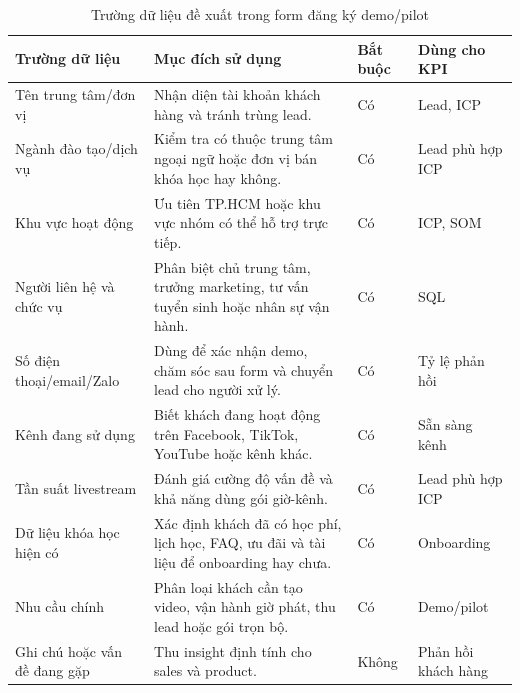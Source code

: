 \begin{table}[H]
    \centering
    \footnotesize
    \setlength{\tabcolsep}{3pt}
    \renewcommand{\arraystretch}{1.22}
    \caption{Trường dữ liệu đề xuất trong form đăng ký demo/pilot}
    \label{tab:lead-form-fields-1stream}
    \begin{tabularx}{\linewidth}{@{}L{3.0cm}Y L{2.3cm}L{2.4cm}@{}}
        \toprule
        \textbf{Trường dữ liệu} &
        \textbf{Mục đích sử dụng} &
        \textbf{Bắt buộc} &
        \textbf{Dùng cho KPI} \\ \midrule

        Tên trung tâm/đơn vị &
        Nhận diện tài khoản khách hàng và tránh trùng lead. &
        Có &
        Lead, ICP \\

        Ngành đào tạo/dịch vụ &
        Kiểm tra có thuộc trung tâm ngoại ngữ hoặc đơn vị bán khóa học hay không. &
        Có &
        Lead phù hợp ICP \\

        Khu vực hoạt động &
        Ưu tiên TP.HCM hoặc khu vực nhóm có thể hỗ trợ trực tiếp. &
        Có &
        ICP, SOM \\

        Người liên hệ và chức vụ &
        Phân biệt chủ trung tâm, trưởng marketing, tư vấn tuyển sinh hoặc nhân
        sự vận hành. &
        Có &
        SQL \\

        Số điện thoại/email/Zalo &
        Dùng để xác nhận demo, chăm sóc sau form và chuyển lead cho người xử lý. &
        Có &
        Tỷ lệ phản hồi \\

        Kênh đang sử dụng &
        Biết khách đang hoạt động trên Facebook, TikTok, YouTube hoặc kênh khác. &
        Có &
        Sẵn sàng kênh \\

        Tần suất livestream &
        Đánh giá cường độ vấn đề và khả năng dùng gói giờ-kênh. &
        Có &
        Lead phù hợp ICP \\

        Dữ liệu khóa học hiện có &
        Xác định khách đã có học phí, lịch học, FAQ, ưu đãi và tài liệu để
        onboarding hay chưa. &
        Có &
        Onboarding \\

        Nhu cầu chính &
        Phân loại khách cần tạo video, vận hành giờ phát, thu lead hoặc gói trọn
        bộ. &
        Có &
        Demo/pilot \\

        Ghi chú hoặc vấn đề đang gặp &
        Thu insight định tính cho sales và product. &
        Không &
        Phản hồi khách hàng \\ \bottomrule
    \end{tabularx}
\end{table}

